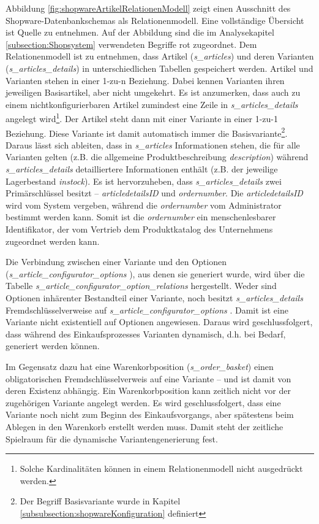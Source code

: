 \documentclass[11pt, a4paper, titlepage, listof=totoc, bibliography=totoc, index=totoc, twoside, openright, headings=normal]{scrreprt}
\begin{document}
Abbildung \ref{fig:shopwareArtikelRelationenModell} zeigt einen Ausschnitt des Shopware-Datenbankschemas als Relationenmodell. Eine vollständige Übersicht ist Quelle \citet{shopwareDatabaseScheme} zu entnehmen. Auf der Abbildung sind die im Analysekapitel \ref{subsection:Shopsystem} verwendeten Begriffe rot zugeordnet. Dem Relationenmodell ist zu entnehmen, dass Artikel (\emph{s\_articles}) und deren Varianten (\emph{s\_articles\_details}) in unterschiedlichen Tabellen gespeichert werden. Artikel und Varianten stehen in einer 1-zu-n Beziehung. Dabei kennen Varianten ihren jeweiligen Basisartikel, aber nicht umgekehrt. Es ist anzumerken, dass auch zu einem nichtkonfigurierbaren Artikel zumindest eine Zeile in \emph{s\_articles\_details} angelegt wird\footnote{Solche Kardinalitäten können in einem Relationenmodell nicht ausgedrückt werden.}. Der Artikel steht dann mit einer Variante in einer 1-zu-1 Beziehung. Diese Variante ist damit automatisch immer die Basisvariante\footnote{Der Begriff Basisvariante wurde in Kapitel \ref{subsubsection:shopwareKonfiguration} definiert}. Daraus lässt sich ableiten, dass in \emph{s\_articles} Informationen stehen, die für alle Varianten gelten (z.B. die allgemeine Produktbeschreibung \emph{description}) während \emph{s\_articles\_details} detailliertere Informationen enthält (z.B. der jeweilige Lagerbestand \emph{instock}). Es ist hervorzuheben, dass \emph{s\_articles\_details} zwei Primärschlüssel besitzt -- \emph{articledetailsID} und \emph{ordernumber}. Die \emph{articledetailsID} wird vom System vergeben, während die \emph{ordernumber} vom Administrator bestimmt werden kann. Somit ist die \emph{ordernumber} ein menschenlesbarer Identifikator, der vom Vertrieb dem Produktkatalog des Unternehmens zugeordnet werden kann.

Die Verbindung zwischen einer Variante und den Optionen (\emph{s\_article\_configurator\_options }), aus denen sie generiert wurde, wird über die Tabelle \emph{s\_article\_configurator\_option\_relations} hergestellt. Weder sind Optionen inhärenter Bestandteil einer Variante, noch besitzt \emph{s\_articles\_details} Fremdschlüsselverweise auf \emph{s\_article\_configurator\_options }. Damit ist eine Variante nicht existentiell auf Optionen angewiesen. Daraus wird geschlussfolgert, dass während des Einkaufsprozesses Varianten dynamisch, d.h. bei Bedarf, generiert werden können.

Im Gegensatz dazu hat eine Warenkorbposition (\emph{s\_order\_basket}) einen obligatorischen Fremdschlüsselverweis auf eine Variante -- und ist damit von deren Existenz abhängig. Ein Warenkorbposition kann zeitlich nicht vor der zugehörigen Variante angelegt werden. Es wird geschlussfolgert, dass eine Variante noch nicht zum Beginn des Einkaufsvorgangs, aber spätestens beim Ablegen in den Warenkorb erstellt werden muss. Damit steht der zeitliche Spielraum für die dynamische Variantengenerierung fest.
\end{document}
